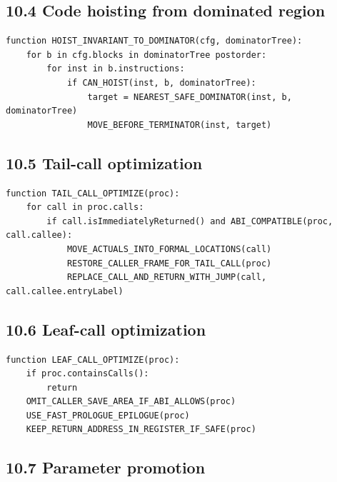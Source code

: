 \documentclass[10pt,letterpaper]{article}
\begin{document}
\subsection*{10.4 Code hoisting from dominated region}
{}

\begin{verbatim}
function HOIST_INVARIANT_TO_DOMINATOR(cfg, dominatorTree):
    for b in cfg.blocks in dominatorTree postorder:
        for inst in b.instructions:
            if CAN_HOIST(inst, b, dominatorTree):
                target = NEAREST_SAFE_DOMINATOR(inst, b, dominatorTree)
                MOVE_BEFORE_TERMINATOR(inst, target)
\end{verbatim}

\subsection*{10.5 Tail-call optimization}
{}

\begin{verbatim}
function TAIL_CALL_OPTIMIZE(proc):
    for call in proc.calls:
        if call.isImmediatelyReturned() and ABI_COMPATIBLE(proc, call.callee):
            MOVE_ACTUALS_INTO_FORMAL_LOCATIONS(call)
            RESTORE_CALLER_FRAME_FOR_TAIL_CALL(proc)
            REPLACE_CALL_AND_RETURN_WITH_JUMP(call, call.callee.entryLabel)
\end{verbatim}

\subsection*{10.6 Leaf-call optimization}
{}

\begin{verbatim}
function LEAF_CALL_OPTIMIZE(proc):
    if proc.containsCalls():
        return
    OMIT_CALLER_SAVE_AREA_IF_ABI_ALLOWS(proc)
    USE_FAST_PROLOGUE_EPILOGUE(proc)
    KEEP_RETURN_ADDRESS_IN_REGISTER_IF_SAFE(proc)
\end{verbatim}

\subsection*{10.7 Parameter promotion}
{}
\end{document}
